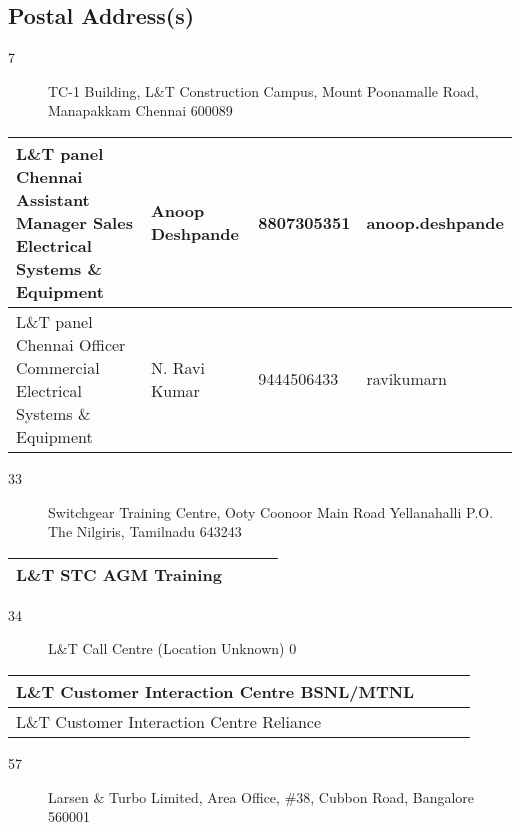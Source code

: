 \documentclass[a4paper, 11pt, twoside]{book}
\begin{document}
\subsection*{Postal Address(s)}
\begin{description}
\item [7]TC-1 Building, L\&T Construction Campus, Mount Poonamalle Road, Manapakkam Chennai 600089
\end{description}
\begin{tabular}{|p{4cm}|p{2cm}|p{2cm}|p{3cm}|}
\hline
L\&T panel Chennai Assistant Manager Sales Electrical Systems \& Equipment & Anoop Deshpande & 8807305351 & anoop.deshpande \\ \hline
L\&T panel Chennai Officer Commercial Electrical Systems \& Equipment & N. Ravi Kumar & 9444506433 & ravikumarn \\ \hline
\end{tabular}
\begin{description}
\item [33]Switchgear Training Centre, Ooty Coonoor Main Road Yellanahalli P.O. The Nilgiris, Tamilnadu 643243
\end{description}
\begin{tabular}{|p{4cm}|p{2cm}|p{2cm}|p{3cm}|}
\hline
L\&T STC AGM Training & & &  \\ \hline
\end{tabular}
\begin{description}
\item [34]L\&T Call Centre (Location Unknown) 0
\end{description}
\begin{tabular}{|p{4cm}|p{2cm}|p{2cm}|p{3cm}|}
\hline
L\&T Customer Interaction Centre BSNL/MTNL & & &  \\ \hline
L\&T Customer Interaction Centre Reliance & & &  \\ \hline
\end{tabular}
\begin{description}
\item [57]Larsen \& Turbo Limited, Area Office, \#38, Cubbon Road, Bangalore 560001
\end{description}
\end{document}
